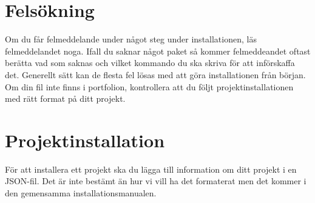 \documentclass{TDP003mall}
\begin{document}
\section{Felsökning}
Om du får felmeddelande under något steg under installationen, läs felmeddelandet noga. Ifall du saknar något paket så kommer felmeddeandet oftast berätta vad som saknas och vilket kommando du ska skriva för att införskaffa det. Generellt sätt kan de flesta fel lösas med att göra installationen från början. \\
Om din fil inte finns i portfolion, kontrollera att du följt projektinstallationen med rätt format på ditt projekt.
\section{Projektinstallation}
För att installera ett projekt ska du lägga till information om ditt projekt i en JSON-fil. Det är inte bestämt än hur vi vill ha det formaterat men det kommer i den gemensamma installationsmanualen.
\end{document}

